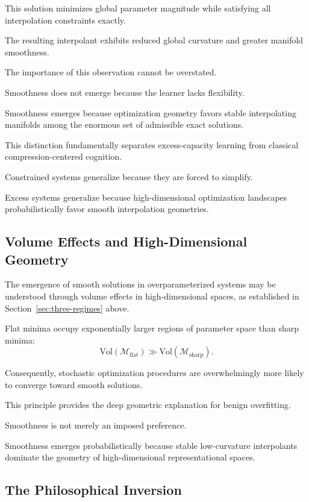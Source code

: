 \documentclass[12pt,a4paper]{article}
\begin{document}
This solution minimizes global parameter magnitude while satisfying all interpolation constraints exactly.

The resulting interpolant exhibits reduced global curvature and greater manifold smoothness.

The importance of this observation cannot be overstated.

Smoothness does not emerge because the learner lacks flexibility.

Smoothness emerges because optimization geometry favors stable interpolating manifolds among the enormous set of admissible exact solutions.

This distinction fundamentally separates excess-capacity learning from classical compression-centered cognition.

Constrained systems generalize because they are forced to simplify.

Excess systems generalize because high-dimensional optimization landscapes probabilistically favor smooth interpolation geometries.

\subsection{Volume Effects and High-Dimensional Geometry}

The emergence of smooth solutions in overparameterized systems may be understood through volume effects in high-dimensional spaces, as established in Section~\ref{sec:three-regimes} above.

Flat minima occupy exponentially larger regions of parameter space than sharp minima:
\[
\text{Vol}(\mathcal{M}_{\text{flat}})
\gg
\text{Vol}(\mathcal{M}_{\text{sharp}}).
\]

Consequently, stochastic optimization procedures are overwhelmingly more likely to converge toward smooth solutions.

This principle provides the deep geometric explanation for benign overfitting.

Smoothness is not merely an imposed preference.

Smoothness emerges probabilistically because stable low-curvature interpolants dominate the geometry of high-dimensional representational spaces.

\subsection{The Philosophical Inversion}
\end{document}
